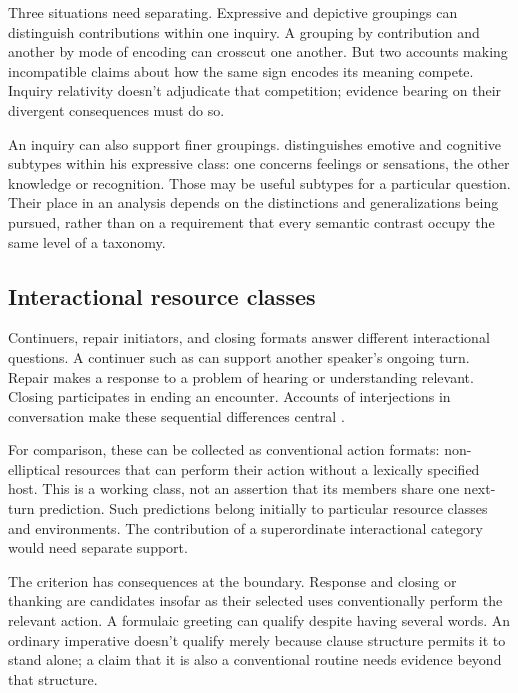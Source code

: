Three situations need separating. Expressive and depictive groupings can
distinguish contributions within one inquiry. A grouping by contribution
and another by mode of encoding can crosscut one another. But two accounts
making incompatible claims about how the same sign encodes its meaning
compete. Inquiry relativity doesn't adjudicate that competition; evidence
bearing on their divergent consequences must do so.

An inquiry can also support finer groupings. \textcite[113]{ameka1992}
distinguishes emotive and cognitive subtypes within his expressive class:
one concerns feelings or sensations, the other knowledge or recognition.
Those may be useful subtypes for a particular question. Their place in
an analysis depends on the distinctions and generalizations being pursued,
rather than on a requirement that every semantic contrast occupy the same
level of a taxonomy.

\subsection{Interactional resource classes}

Continuers, repair initiators, and closing formats answer different
interactional questions. A continuer such as  can support
another speaker's ongoing turn. Repair  makes a response to
a problem of hearing or understanding relevant. Closing 
participates in ending an encounter. Accounts of interjections in
conversation make these sequential differences central
\citep[257--259, 263--265]{dingemanse2024}.

For comparison, these can be collected as conventional action formats:
non-elliptical resources that can perform their action without a lexically
specified host. This is a working class, not an assertion that its members
share one next-turn prediction. Such predictions belong initially to
particular resource classes and environments. The contribution of a
superordinate interactional category would need separate support.

The criterion has consequences at the boundary. Response 
and closing or thanking  are candidates insofar as their
selected uses conventionally perform the relevant action. A formulaic
greeting  can qualify despite having several words.
An ordinary imperative  doesn't qualify merely because
clause structure permits it to stand alone; a claim that it is also a
conventional routine needs evidence beyond that structure.

